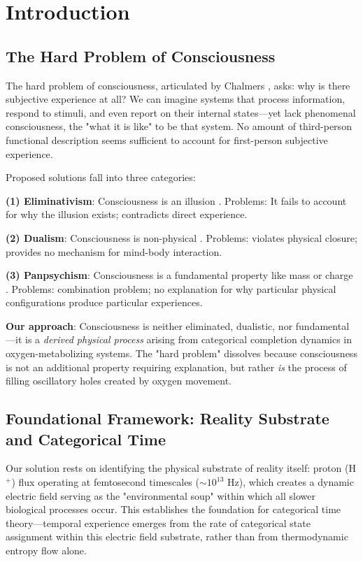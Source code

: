 \documentclass[11pt,a4paper]{article}
\begin{document}
\tableofcontents

\section{Introduction}

\subsection{The Hard Problem of Consciousness}

The hard problem of consciousness, articulated by Chalmers \cite{chalmers1995facing}, asks: why is there subjective experience at all? We can imagine systems that process information, respond to stimuli, and even report on their internal states—yet lack phenomenal consciousness, the "what it is like" to be that system. No amount of third-person functional description seems sufficient to account for first-person subjective experience.

Proposed solutions fall into three categories:

\textbf{(1) Eliminativism}: Consciousness is an illusion \cite{dennett1991consciousness}. Problems: It fails to account for why the illusion exists; contradicts direct experience.

\textbf{(2) Dualism}: Consciousness is non-physical \cite{chalmers1996conscious}. Problems: violates physical closure; provides no mechanism for mind-body interaction.

\textbf{(3) Panpsychism}: Consciousness is a fundamental property like mass or charge \cite{tononi2016integrated}. Problems: combination problem; no explanation for why particular physical configurations produce particular experiences.

\textbf{Our approach}: Consciousness is neither eliminated, dualistic, nor fundamental—it is a \textit{derived physical process} arising from categorical completion dynamics in oxygen-metabolizing systems. The "hard problem" dissolves because consciousness is not an additional property requiring explanation, but rather \textit{is} the process of filling oscillatory holes created by oxygen movement.

\subsection{Foundational Framework: Reality Substrate and Categorical Time}

Our solution rests on identifying the physical substrate of reality itself: proton (H$^+$) flux operating at femtosecond timescales ($\sim 10^{13}$ Hz), which creates a dynamic electric field serving as the "environmental soup" within which all slower biological processes occur. This establishes the foundation for categorical time theory—temporal experience emerges from the rate of categorical state assignment within this electric field substrate, rather than from thermodynamic entropy flow alone.
\end{document}
